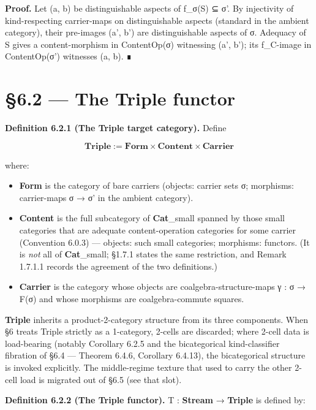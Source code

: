 \documentclass[11pt, openany]{book}
\newcommand{\sectionbreak}{\clearpage}
\begin{document}
\textbf{Proof.} Let (a, b) be distinguishable aspects of f\_\allowbreak{}σ(S) ⊆ σ'. By injectivity of kind-respecting carrier-maps on distinguishable aspects (standard in the ambient category), their pre-images (a', b') are distinguishable aspects of σ. Adequacy of S gives a content-morphism in ContentOp(σ) witnessing (a', b'); its f\_\allowbreak{}C-image in ContentOp(σ') witnesses (a, b). ∎

\sectionbreak

\section{§6.2 --- The Triple functor}

\textbf{Definition 6.2.1 (The Triple target category).} Define

\[
\mathbf{Triple} := \mathbf{Form} \times \mathbf{Content} \times \mathbf{Carrier}
\]

where:

\begin{itemize}
\item \textbf{Form} is the category of bare carriers (objects: carrier sets σ; morphisms: carrier-maps σ → σ' in the ambient category).
\item \textbf{Content} is the full subcategory of \textbf{Cat}\_\allowbreak{}small spanned by those small categories that are adequate content-operation categories for some carrier (Convention 6.0.3) --- objects: such small categories; morphisms: functors. (It is \textit{not} all of \textbf{Cat}\_\allowbreak{}small; §1.7.1 states the same restriction, and Remark 1.7.1.1 records the agreement of the two definitions.)
\item \textbf{Carrier} is the category whose objects are coalgebra-structure-maps γ : σ → F(σ) and whose morphisms are coalgebra-commute squares.
\end{itemize}

\textbf{Triple} inherits a product-2-category structure from its three components. When §6 treats Triple strictly as a 1-category, 2-cells are discarded; where 2-cell data is load-bearing (notably Corollary 6.2.5 and the bicategorical kind-classifier fibration of §6.4 --- Theorem 6.4.6, Corollary 6.4.13), the bicategorical structure is invoked explicitly. The middle-regime texture that used to carry the other 2-cell load is migrated out of §6.5 (see that slot).

\textbf{Definition 6.2.2 (The Triple functor).} T : \textbf{Stream} → \textbf{Triple} is defined by:
\end{document}
